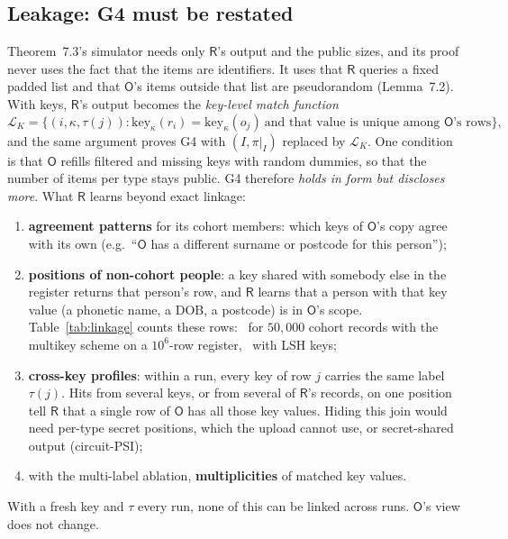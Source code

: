 \documentclass[10pt]{article}
\newcommand{\Rp}{\mathsf{R}}
\newcommand{\Op}{\mathsf{O}}
\begin{document}
\subsection{Leakage: G4 must be restated}
\label{sec:leak}
Theorem~7.3's simulator needs only $\Rp$'s output and the public sizes, and its proof never uses the fact that the items are identifiers. It uses that $\Rp$ queries a fixed padded list and that $\Op$'s items outside that list are pseudorandom (Lemma~7.2). With keys, $\Rp$'s output becomes the \emph{key-level match function}
\[
  \mathcal L_K=\bigl\{(i,\kappa,\tau(j)) : \mathrm{key}_\kappa(r_i)=\mathrm{key}_\kappa(o_j)\ \text{and that value is unique among }\Op\text{'s rows}\bigr\},
\]
and the same argument proves G4 with $(I,\pi|_I)$ replaced by $\mathcal L_K$. One condition is that $\Op$ refills filtered and missing keys with random dummies, so that the number of items per type stays public. G4 therefore \emph{holds in form but discloses more}. What $\Rp$ learns beyond exact linkage:
\begin{enumerate}
\item \textbf{agreement patterns} for its cohort members: which keys of $\Op$'s copy agree with its own (e.g.\ ``$\Op$ has a different surname or postcode for this person'');
\item \textbf{positions of non-cohort people}: a key shared with somebody else in the register returns that person's row, and $\Rp$ learns that a person with that key value (a phonetic name, a DOB, a postcode) is in $\Op$'s scope. Table~\ref{tab:linkage} counts these rows: \MKnoncohort\ for $50{,}000$ cohort records with the multikey scheme on a $10^6$-row register, \LSHnoncohort\ with LSH keys;
\item \textbf{cross-key profiles}: within a run, every key of row $j$ carries the same label $\tau(j)$. Hits from several keys, or from several of $\Rp$'s records, on one position tell $\Rp$ that a single row of $\Op$ has all those key values. Hiding this join would need per-type secret positions, which the upload cannot use, or secret-shared output (circuit-PSI);
\item with the multi-label ablation, \textbf{multiplicities} of matched key values.
\end{enumerate}
With a fresh key and $\tau$ every run, none of this can be linked across runs. $\Op$'s view does not change.
\end{document}
